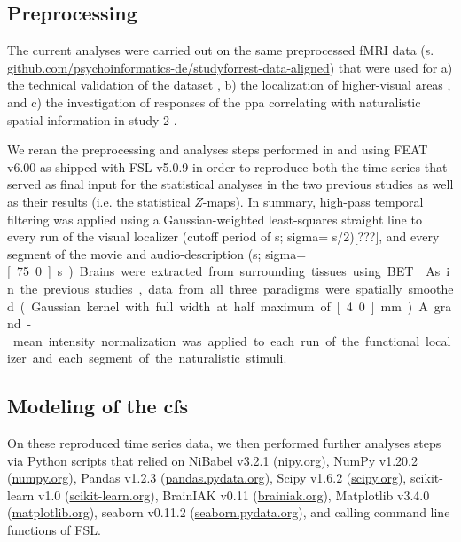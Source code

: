 \subsection{Preprocessing}

The current analyses were carried out on the same preprocessed fMRI data (s.
\href{https://github.com/psychoinformatics-de/studyforrest-data-aligned
}{\url{github.com/psychoinformatics-de/studyforrest-data-aligned}}) that were
used for
%
a) the technical validation of the dataset \citep{hanke2016simultaneous},
%
b) the localization of higher-visual areas \citep{sengupta2016extension}, and
%
c) the investigation of responses of the \ac{ppa} correlating with naturalistic
spatial information in study 2 \citep{haeusler2022processing}.

%
We reran the preprocessing and analyses steps performed in
\citet{sengupta2016extension} and \citet{haeusler2022processing} using FEAT
v6.00 \citep[FMRI Expert Analysis Tool;][]{woolrich2001autocorr} as shipped with
FSL v5.0.9 \citep[\href{https://www.fmrib.ox.ac.uk/fsl}{FMRIB's Software
Library;}][]{smith2004fsl} in order to reproduce both the time series that
served as final input for the statistical analyses in the two previous studies
as well as their results (i.e. the statistical $Z$-maps).
In summary, high-pass temporal filtering was applied using a Gaussian-weighted
least-squares straight line to every run of the visual localizer (cutoff period
of \unit[100]{s}; sigma= \unit[100]{s}/2)[???], and every segment of the movie
and audio-description (\unit[150]{s}; sigma=\unit[75.0]{s}).
Brains were extracted from surrounding tissues using BET \citep{smith2002bet}.
As in the previous studies, data from all three paradigms were spatially
smoothed (Gaussian kernel with full width at half maximum of \unit[4.0]{mm}).
A grand-mean intensity normalization was applied to each run of the functional
localizer and each segment of the naturalistic stimuli.


\subsection{Modeling of the \ac{cfs}}

On these reproduced time series data, we then performed further analyses steps
via Python scripts that relied on
%
NiBabel v3.2.1 (\href{https://nipy.org}{\url{nipy.org}}),
%
NumPy v1.20.2 (\href{https://numpy.org}{\url{numpy.org}}),
%
Pandas v1.2.3 (\href{https://pandas.pydata.org}{\url{pandas.pydata.org}}),
%
Scipy v1.6.2 (\href{https://scipy.org}{\url{scipy.org}}),
%
scikit-learn v1.0 (\href{https://scikit-learn.org}{\url{scikit-learn.org}}),
%
BrainIAK v0.11 (\href{https://brainiak.org}{\url{brainiak.org}}),
%
Matplotlib v3.4.0 (\href{https://matplotlib.org}{\url{matplotlib.org}}),
%
seaborn v0.11.2 (\href{https://seaborn.pydata.org}{\url{seaborn.pydata.org}}),
%
and calling command line functions of FSL.

